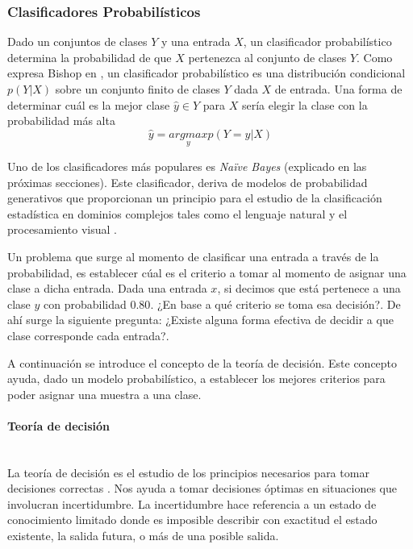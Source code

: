 \subsubsection{Clasificadores Probabilísticos}
\label{subsubsection:clas_prob}

	Dado un conjuntos de clases $Y$ y una entrada $X$, un clasificador pro\-ba\-bi\-lís\-ti\-co determina la probabilidad de que $X$ pertenezca al conjunto de clases $Y$. Como expresa Bishop en \cite{Bis07}, un clasificador probabilístico es una distribución condicional $p(Y|X)$ sobre un conjunto finito de clases $Y$ dada $X$ de entrada. Una forma de determinar cuál es la mejor clase $\hat{y} \in Y$ para $X$ sería elegir la clase con la probabilidad más alta
	$$\hat{y} = \underset{y}{argmax}p(Y=y|X) $$
	
	Uno de los clasificadores más populares es \textit{Na\"{i}ve Bayes} (explicado en las próximas secciones). Este clasificador, deriva de modelos de probabilidad generativos que proporcionan un principio para el estudio de la clasificación estadística en dominios complejos tales como el lenguaje natural y el procesamiento visual \cite{GargRo01}.
	
	Un problema que surge al momento de clasificar una entrada a través de la probabilidad, es establecer cúal es el criterio a tomar al momento de asignar una clase a dicha entrada. Dada una entrada $x$, si decimos que está pertenece a una clase $y$ con probabilidad $0.80$. ¿En base a qué criterio se toma esa decisión?. De ahí surge la siguiente pregunta: ¿Existe alguna forma efectiva de decidir a que clase corresponde cada entrada?.
	
	 A continuación se introduce el concepto de la teoría de decisión. Este concepto ayuda, dado un modelo probabilístico, a establecer los mejores criterios para poder asignar una muestra a una clase.
	
 \paragraph{Teoría de decisión} ~\\
	
	La teoría de decisión es el estudio de los principios necesarios para tomar decisiones correctas \cite{Hansson05}. Nos ayuda a tomar decisiones óptimas en situaciones que involucran incertidumbre. La incertidumbre hace referencia a un estado de conocimiento limitado donde es imposible describir con exactitud el estado existente, la salida futura, o más de una posible salida.
	
